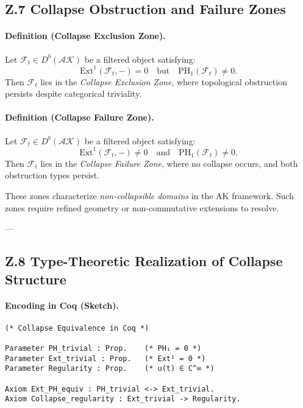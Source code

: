 \documentclass[11pt]{article}
\begin{document}
\subsection*{Z.7 Collapse Obstruction and Failure Zones}

\paragraph{Definition (Collapse Exclusion Zone).}
Let \( \mathcal{F}_t \in D^b(\mathcal{AK}) \) be a filtered object satisfying:
\[
\mathrm{Ext}^1(\mathcal{F}_t, -) = 0 \quad \text{but} \quad \mathrm{PH}_1(\mathcal{F}_t) \neq 0.
\]
Then \( \mathcal{F}_t \) lies in the \emph{Collapse Exclusion Zone}, where topological obstruction persists despite categorical triviality.

\paragraph{Definition (Collapse Failure Zone).}
Let \( \mathcal{F}_t \in D^b(\mathcal{AK}) \) be a filtered object satisfying:
\[
\mathrm{Ext}^1(\mathcal{F}_t, -) \neq 0 \quad \text{and} \quad \mathrm{PH}_1(\mathcal{F}_t) \neq 0.
\]
Then \( \mathcal{F}_t \) lies in the \emph{Collapse Failure Zone}, where no collapse occurs, and both obstruction types persist.

These zones characterize \emph{non-collapsible domains} in the AK framework.  
Such zones require refined geometry or non-commutative extensions to resolve.

---

\subsection*{Z.8 Type-Theoretic Realization of Collapse Structure}

\paragraph{Encoding in Coq (Sketch).}

\begin{lstlisting}[language=Coq, caption=Collapse Structure Encoded in Coq Type Theory]
(* Collapse Equivalence in Coq *)

Parameter PH_trivial : Prop.    (* PH₁ = 0 *)
Parameter Ext_trivial : Prop.   (* Ext¹ = 0 *)
Parameter Regularity : Prop.    (* u(t) ∈ C^∞ *)

Axiom Ext_PH_equiv : PH_trivial <-> Ext_trivial.
Axiom Collapse_regularity : Ext_trivial -> Regularity.
\end{lstlisting}
\end{document}
